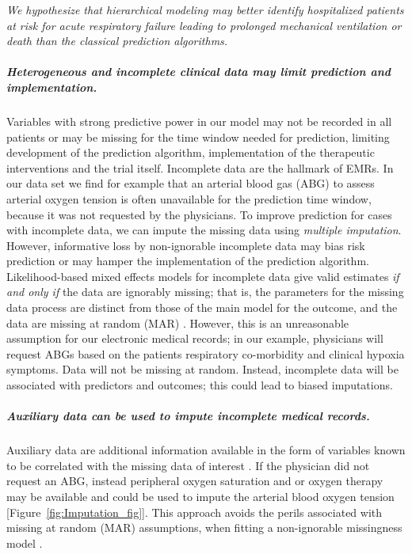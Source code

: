 \documentclass[11pt,notitlepage]{article}
\begin{document}
\emph{We hypothesize that hierarchical modeling may better identify hospitalized patients at risk for acute respiratory failure leading to prolonged mechanical ventilation or death than the classical prediction algorithms.}


\subparagraph*{Heterogeneous and incomplete clinical data may limit prediction and implementation.}
Variables with strong predictive power in our model may not be recorded in all patients or may be missing for the time window needed for prediction, limiting development of the prediction algorithm, implementation of the therapeutic interventions and the trial itself. Incomplete data are the hallmark of EMRs. In our data set we find for example that an arterial blood gas (ABG) to assess arterial oxygen tension is often unavailable for the prediction time window, because it was not requested by the physicians. To improve prediction for cases with incomplete data, we can impute the missing data using \textit{multiple imputation}. However, informative loss by non-ignorable incomplete data may bias risk prediction or may hamper the implementation of the prediction algorithm. Likelihood-based mixed effects models for incomplete data give valid estimates \textit{if and only if } the data are ignorably missing; that is, the parameters for the missing data process are distinct from those of the main model for the outcome, and the data are missing at random (MAR) \cite{Rubin_1976}. However, this is an unreasonable assumption for our electronic medical records; in our example, physicians will request ABGs based on the patients respiratory co-morbidity and clinical hypoxia symptoms. Data will not be missing at random. Instead, incomplete data will be associated with predictors and outcomes; this could lead to biased imputations.

\subparagraph*{Auxiliary data can be used to impute incomplete medical records.} Auxiliary data are additional information available in the form of variables known to be correlated with the missing data of interest \cite{Daniels24571539}. If the physician did not request an ABG, instead peripheral oxygen saturation and or oxygen therapy may be available and could be used to impute the arterial blood oxygen tension [Figure~\ref{fig:Imputation_fig}]. This approach avoids the perils associated with missing at random (MAR) assumptions, when fitting a non-ignorable missingness model \cite{Wang_20029935}.
\end{document}
